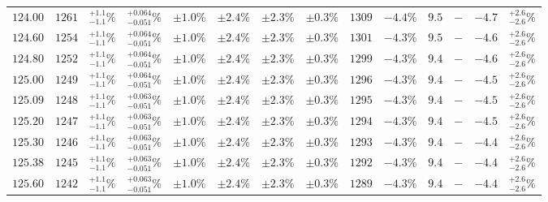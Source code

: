 \begin{landscape}
\begin{table}[ht!]
{\begin{tabular}{| cc | ccc | ccc | ccc | cc | c |}
$124.00$ & $1261$ & $^{+1.1}_{-1.1}\%$ & {\color{black!55}$^{+0.064}_{-0.051}\%$} & {\color{black!55}$\pm 1.0\%$} & $\pm 2.4\%$ & {\color{black!55}$\pm 2.3\%$} & {\color{black!55}$\pm 0.3\%$} & $1309$ & $-4.4\%$ & $9.5$ & $-$ & $-4.7$ & $^{+2.6}_{-2.6}\%$ \\
$124.60$ & $1254$ & $^{+1.1}_{-1.1}\%$ & {\color{black!55}$^{+0.064}_{-0.051}\%$} & {\color{black!55}$\pm 1.0\%$} & $\pm 2.4\%$ & {\color{black!55}$\pm 2.3\%$} & {\color{black!55}$\pm 0.3\%$} & $1301$ & $-4.3\%$ & $9.5$ & $-$ & $-4.6$ & $^{+2.6}_{-2.6}\%$ \\
$124.80$ & $1252$ & $^{+1.1}_{-1.1}\%$ & {\color{black!55}$^{+0.064}_{-0.051}\%$} & {\color{black!55}$\pm 1.0\%$} & $\pm 2.4\%$ & {\color{black!55}$\pm 2.3\%$} & {\color{black!55}$\pm 0.3\%$} & $1299$ & $-4.3\%$ & $9.4$ & $-$ & $-4.6$ & $^{+2.6}_{-2.6}\%$ \\
$125.00$ & $1249$ & $^{+1.1}_{-1.1}\%$ & {\color{black!55}$^{+0.064}_{-0.051}\%$} & {\color{black!55}$\pm 1.0\%$} & $\pm 2.4\%$ & {\color{black!55}$\pm 2.3\%$} & {\color{black!55}$\pm 0.3\%$} & $1296$ & $-4.3\%$ & $9.4$ & $-$ & $-4.5$ & $^{+2.6}_{-2.6}\%$ \\
$125.09$ & $1248$ & $^{+1.1}_{-1.1}\%$ & {\color{black!55}$^{+0.063}_{-0.051}\%$} & {\color{black!55}$\pm 1.0\%$} & $\pm 2.4\%$ & {\color{black!55}$\pm 2.3\%$} & {\color{black!55}$\pm 0.3\%$} & $1295$ & $-4.3\%$ & $9.4$ & $-$ & $-4.5$ & $^{+2.6}_{-2.6}\%$ \\
$125.20$ & $1247$ & $^{+1.1}_{-1.1}\%$ & {\color{black!55}$^{+0.063}_{-0.051}\%$} & {\color{black!55}$\pm 1.0\%$} & $\pm 2.4\%$ & {\color{black!55}$\pm 2.3\%$} & {\color{black!55}$\pm 0.3\%$} & $1294$ & $-4.3\%$ & $9.4$ & $-$ & $-4.5$ & $^{+2.6}_{-2.6}\%$ \\
$125.30$ & $1246$ & $^{+1.1}_{-1.1}\%$ & {\color{black!55}$^{+0.063}_{-0.051}\%$} & {\color{black!55}$\pm 1.0\%$} & $\pm 2.4\%$ & {\color{black!55}$\pm 2.3\%$} & {\color{black!55}$\pm 0.3\%$} & $1293$ & $-4.3\%$ & $9.4$ & $-$ & $-4.4$ & $^{+2.6}_{-2.6}\%$ \\
$125.38$ & $1245$ & $^{+1.1}_{-1.1}\%$ & {\color{black!55}$^{+0.063}_{-0.051}\%$} & {\color{black!55}$\pm 1.0\%$} & $\pm 2.4\%$ & {\color{black!55}$\pm 2.3\%$} & {\color{black!55}$\pm 0.3\%$} & $1292$ & $-4.3\%$ & $9.4$ & $-$ & $-4.4$ & $^{+2.6}_{-2.6}\%$ \\
$125.60$ & $1242$ & $^{+1.1}_{-1.1}\%$ & {\color{black!55}$^{+0.063}_{-0.051}\%$} & {\color{black!55}$\pm 1.0\%$} & $\pm 2.4\%$ & {\color{black!55}$\pm 2.3\%$} & {\color{black!55}$\pm 0.3\%$} & $1289$ & $-4.3\%$ & $9.4$ & $-$ & $-4.4$ & $^{+2.6}_{-2.6}\%$ \\

\end{tabular}}
\end{table}
\end{landscape}

